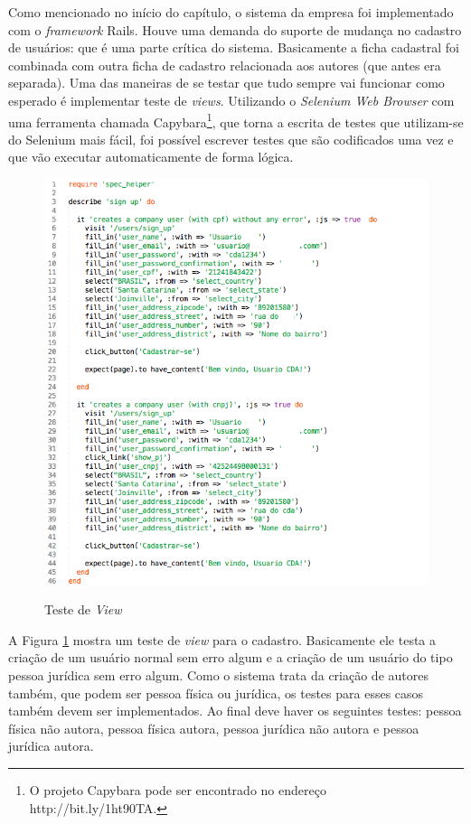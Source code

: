 Como mencionado no início do capítulo, o sistema da empresa foi implementado com o \textit{framework} Rails. Houve uma demanda do suporte de mudança no cadastro de usuários: que é uma parte crítica do sistema. Basicamente a ficha cadastral foi combinada com outra ficha de cadastro relacionada aos autores (que antes era separada). Uma das maneiras de se testar que tudo sempre vai funcionar como esperado é implementar teste de \textit{views}. Utilizando o \textit{Selenium Web Browser} com uma ferramenta chamada Capybara\footnote{O projeto Capybara pode ser encontrado no endereço http://bit.ly/1ht90TA.}, que torna a escrita de testes que utilizam-se do Selenium mais fácil, foi possível escrever testes que são codificados uma vez e que vão executar automaticamente de forma lógica. 

\begin{figure}[htb!]
\begin{center}
\caption{Teste de \textit{View}}
\label{fig:teste_view}
\includegraphics[width=15cm]{assets/teste_view} \\
\end{center}
\end{figure}

A Figura \ref{fig:teste_view} mostra um teste de \textit{view} para o cadastro. Basicamente ele testa a criação de um usuário normal sem erro algum e a criação de um usuário do tipo pessoa jurídica sem erro algum. Como o sistema trata da criação de autores também, que podem ser pessoa física ou jurídica, os testes para esses casos também devem ser implementados. Ao final deve haver os seguintes testes: pessoa física não autora, pessoa física autora, pessoa jurídica não autora e pessoa jurídica autora.

